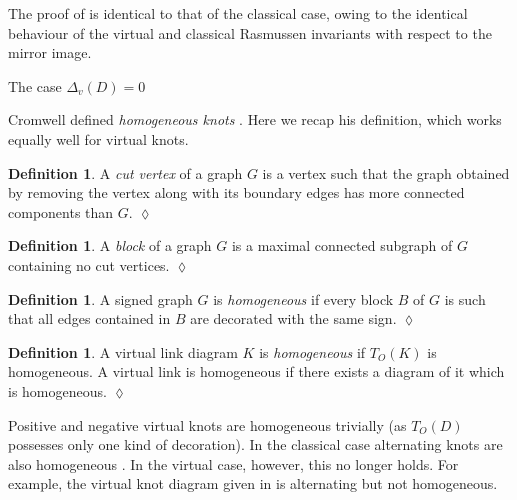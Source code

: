 \documentclass[10pt,oneside]{amsart}
\theoremstyle{definition}
\newtheorem{definition}[theorem]{Definition}
\numberwithin{equation}{section}
\DeclareRobustCommand{\CloseDef}{	\leavevmode\unskip\penalty9999 \hbox{}\nobreak\hfill
	\quad\hbox{$\lozenge$}}
\begin{document}
The proof of  is identical to that of the classical case, owing to the identical behaviour of the virtual and classical Rasmussen invariants with respect to the mirror image.

{		{\normalfont\bfseries}}{The case \( \Delta_v ( D ) = 0 \)}\label{Sec:deltazero}

Cromwell defined \emph{homogeneous knots} \cite{Cromwell1989}. Here we recap his definition, which works equally well for virtual knots.

\begin{definition}
	\label{Def:cutvertex}
	A \emph{cut vertex} of a graph \( G \) is a vertex such that the graph obtained by removing the vertex along with its boundary edges has more connected components than \( G \).\CloseDef
\end{definition}

\begin{definition}
	\label{Def:block}
	A \emph{block} of a graph \( G \) is a maximal connected subgraph of \( G \) containing no cut vertices.\CloseDef
\end{definition}

\begin{definition}
	\label{Def:homogeneousgraph}
	A signed graph \( G \) is \emph{homogeneous} if every block \( B \) of \( G \) is such that all edges contained in \( B \) are decorated with the same sign.\CloseDef
\end{definition}

\begin{definition}
	\label{Def:homogeneous}
	A virtual link diagram \( K \) is \emph{homogeneous} if \( T_O ( K ) \) is homogeneous. A virtual link is homogeneous if there exists a diagram of it which is homogeneous.\CloseDef
\end{definition}

Positive and negative virtual knots are homogeneous trivially (as \( T_O ( D ) \) possesses only one kind of decoration). In the classical case alternating knots are also homogeneous \cite{Kauffman1983}. In the virtual case, however, this no longer holds. For example, the virtual knot diagram given in  is alternating but not homogeneous.
\end{document}
